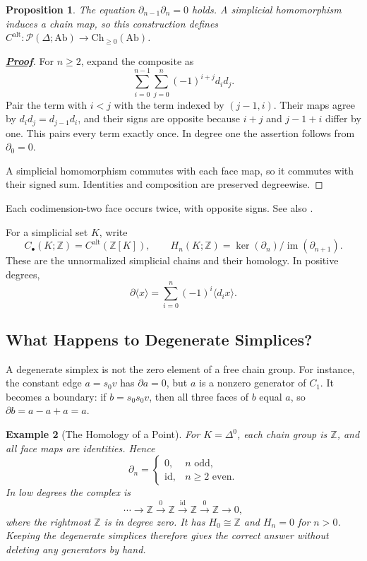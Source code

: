 \documentclass[11pt]{article}
\newcommand{\proofdest}{}
\newcommand{\claim}[1]{\def\proofdest{proof:#1}\hypertarget{statement:#1}{}}
\theoremstyle{linked}
\newtheorem{proposition}{Proposition}[section]
\theoremstyle{plainlecture}
\newtheorem{example}[proposition]{Example}
\newenvironment{linkedproof}[1]{\hypertarget{proof:#1}{}\begin{proof}[\normalfont\bfseries\hyperlink{statement:#1}{Proof}]}{\end{proof}}
\newcommand{\Z}{\mathbb Z}
\newcommand{\PSh}{\mathcal{P}}
\newcommand{\Ch}{\mathrm{Ch}}
\newcommand{\im}{\operatorname{im}}
\newcommand{\id}{\mathrm{id}}
\newcommand{\Ab}{\mathrm{Ab}}
\newcommand{\C}{C^{\mathrm{alt}}}
\begin{document}
\claim{boundary}
\begin{proposition}
The equation $\partial_{n-1}\partial_n=0$ holds. A simplicial homomorphism induces a chain map, so this construction defines $\C:\PSh(\Delta;\Ab)\to\Ch_{\geq0}(\Ab)$.
\end{proposition}
\begin{linkedproof}{boundary}
For $n\geq2$, expand the composite as
\[
\sum_{i=0}^{n-1}\sum_{j=0}^n(-1)^{i+j}d_i d_j.
\]
Pair the term with $i<j$ with the term indexed by $(j-1,i)$. Their maps agree by $d_i d_j=d_{j-1}d_i$, and their signs are opposite because $i+j$ and $j-1+i$ differ by one. This pairs every term exactly once. In degree one the assertion follows from $\partial_0=0$.

A simplicial homomorphism commutes with each face map, so it commutes with their signed sum. Identities and composition are preserved degreewise.
\end{linkedproof}
Each codimension-two face occurs twice, with opposite signs. See also \cite{stacks-chains}.

For a simplicial set $K$, write
\[
C_\bullet(K;\Z)=\C(\Z[K]),\qquad
H_n(K;\Z)=\ker(\partial_n)/\im(\partial_{n+1}).
\]
These are the unnormalized simplicial chains and their homology. In positive degrees,
\[
\partial\langle x\rangle=\sum_{i=0}^n(-1)^i\langle d_ix\rangle.
\]

\subsection{What Happens to Degenerate Simplices?}
A degenerate simplex is not the zero element of a free chain group. For instance, the constant edge $a=s_0v$ has $\partial a=0$, but $a$ is a nonzero generator of $C_1$. It becomes a boundary: if $b=s_0s_0v$, then all three faces of $b$ equal $a$, so $\partial b=a-a+a=a$.

\begin{example}[The Homology of a Point]
For $K=\Delta^{0}$, each chain group is $\Z$, and all face maps are identities. Hence
\[
\partial_n=\begin{cases}0,&n\text{ odd},\\\id,&n\geq2\text{ even}.
\end{cases}
\]
In low degrees the complex is
\[
\cdots\longrightarrow\Z\xrightarrow{0}\Z
\xrightarrow{\id}\Z\xrightarrow{0}\Z\longrightarrow0,
\]
where the rightmost $\Z$ is in degree zero. It has $H_0\cong\Z$ and $H_n=0$ for $n>0$. Keeping the degenerate simplices therefore gives the correct answer without deleting any generators by hand.
\end{example}
\end{document}
